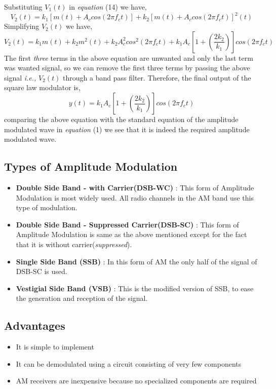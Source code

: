 \documentclass[12pt,a4paper]{article}%
\begin{document}
\begin{flushleft}
\begin{flushleft}
			Substituting $V_1 (t) $ in \textit{equation} (14) we have,
			\begin{equation}
				V_2 (t) = k_1 [m(t) + A_c cos(2 \pi f_c t)] + k_2 [m(t) + A_c cos(2 \pi f_c t)] ^ {2} (t)
			\end{equation}
			Simplifying $V_2 (t)$ we have,
			\begin{equation}
				V_2 (t) = k_1 m(t) + k_2 m^2 (t) + k_2 A_c ^ 2 cos^2 (2 \pi f_c t) + k_1 A_c [1+(\dfrac{2 k_2}{k_1})] cos(2 \pi f_c t)
			\end{equation}
			The first \textit{three} terms in the above equation are unwanted and only the last term was wanted signal, so we can remove the first three terms by passing the above signal \textit{i.e.,} $V_2 (t)$ through a band pass filter. Therefore, the final output of the square law modulator is,
			\begin{equation}
				y(t) = k_1 A_c [1+(\dfrac{2 k_2}{k_1})] cos(2 \pi f_c t)
			\end{equation}
			comparing the above equation with the standard equation of the amplitude modulated wave in \textit{equation} (1) we see that it is indeed the required amplitude modulated wave.
		\end{flushleft}
		
		\subsection{Types of Amplitude Modulation}
		\begin{flushleft}
			\begin{itemize}
				\item{\textbf{Double Side Band - with Carrier(DSB-WC)} : This form of Amplitude Modulation is most widely used. All radio channels in the AM band use this type of modulation.}
				\item{\textbf{Double Side Band - Suppressed Carrier(DSB-SC)} : This form of Amplitude Modulation is same as the above mentioned except for the fact that it is without carrier(\textit{suppressed}).}
				\item{\textbf{Single Side Band (SSB)} : In this form of AM the only half of the signal of DSB-SC is used.}
				\item{\textbf{Vestigial Side Band (VSB)} : This is the modified version of SSB, to ease the generation and reception of the signal.}
			\end{itemize}
		\end{flushleft}
		\subsection{Advantages}
		\begin{itemize}
			\item{It is simple to implement}
			\item{It can be demodulated using a circuit consisting of very few
				components
}
			\item{AM receivers are inexpensive because no specialized components
				are required}
		\end{itemize}

\end{flushleft}
\end{document}
